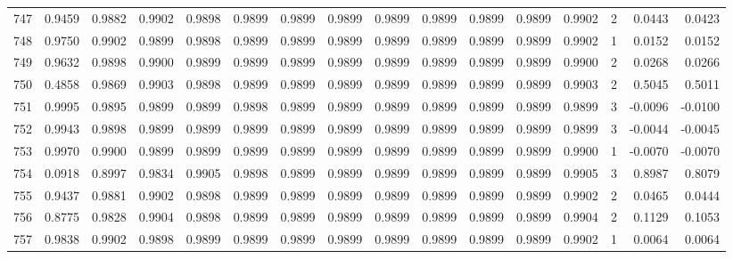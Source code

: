 \begin{tabular}{lrrrrrrrrrrrrrrr}
747 &      0.9459 &  0.9882 &  0.9902 &  0.9898 &  0.9899 &  0.9899 &  0.9899 &  0.9899 &  0.9899 &  0.9899 &   0.9899 &     0.9902 &      2 &                    0.0443 &                     0.0423 \\
748 &      0.9750 &  0.9902 &  0.9899 &  0.9898 &  0.9899 &  0.9899 &  0.9899 &  0.9899 &  0.9899 &  0.9899 &   0.9899 &     0.9902 &      1 &                    0.0152 &                     0.0152 \\
749 &      0.9632 &  0.9898 &  0.9900 &  0.9899 &  0.9899 &  0.9899 &  0.9899 &  0.9899 &  0.9899 &  0.9899 &   0.9899 &     0.9900 &      2 &                    0.0268 &                     0.0266 \\
750 &      0.4858 &  0.9869 &  0.9903 &  0.9898 &  0.9899 &  0.9899 &  0.9899 &  0.9899 &  0.9899 &  0.9899 &   0.9899 &     0.9903 &      2 &                    0.5045 &                     0.5011 \\
751 &      0.9995 &  0.9895 &  0.9899 &  0.9899 &  0.9898 &  0.9899 &  0.9899 &  0.9899 &  0.9899 &  0.9899 &   0.9899 &     0.9899 &      3 &                   -0.0096 &                    -0.0100 \\
752 &      0.9943 &  0.9898 &  0.9899 &  0.9899 &  0.9899 &  0.9899 &  0.9899 &  0.9899 &  0.9899 &  0.9899 &   0.9899 &     0.9899 &      3 &                   -0.0044 &                    -0.0045 \\
753 &      0.9970 &  0.9900 &  0.9899 &  0.9899 &  0.9899 &  0.9899 &  0.9899 &  0.9899 &  0.9899 &  0.9899 &   0.9899 &     0.9900 &      1 &                   -0.0070 &                    -0.0070 \\
754 &      0.0918 &  0.8997 &  0.9834 &  0.9905 &  0.9898 &  0.9899 &  0.9899 &  0.9899 &  0.9899 &  0.9899 &   0.9899 &     0.9905 &      3 &                    0.8987 &                     0.8079 \\
755 &      0.9437 &  0.9881 &  0.9902 &  0.9898 &  0.9899 &  0.9899 &  0.9899 &  0.9899 &  0.9899 &  0.9899 &   0.9899 &     0.9902 &      2 &                    0.0465 &                     0.0444 \\
756 &      0.8775 &  0.9828 &  0.9904 &  0.9898 &  0.9899 &  0.9899 &  0.9899 &  0.9899 &  0.9899 &  0.9899 &   0.9899 &     0.9904 &      2 &                    0.1129 &                     0.1053 \\
757 &      0.9838 &  0.9902 &  0.9898 &  0.9899 &  0.9899 &  0.9899 &  0.9899 &  0.9899 &  0.9899 &  0.9899 &   0.9899 &     0.9902 &      1 &                    0.0064 &                     0.0064 \\

\end{tabular}

